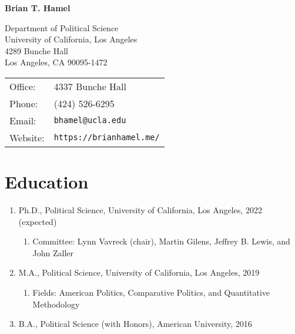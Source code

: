 \documentclass[11pt]{article}
\def\name{\textbf{Brian T. Hamel}}
\begin{document}
{\huge \name}


\vspace{0.25in}

\begin{minipage}{0.5\linewidth}
  Department of Political Science \\
  University of California, Los Angeles \\
  4289 Bunche Hall \\
  Los Angeles, CA 90095-1472 
\end{minipage}
\begin{minipage}{0.5\linewidth}
  \begin{tabular}{ll}
    Office: & 4337 Bunche Hall \\
    Phone: & (424) 526-6295 \\
    Email: & \texttt{bhamel@ucla.edu} \\
    Website: & \texttt{https://brianhamel.me/} \\
  \end{tabular}
\end{minipage}

\section*{Education}

\begin{enumerate}[topsep = 0pt, itemsep = 1ex, partopsep  = 1ex, parsep = 1ex]

	\item[] Ph.D., Political Science, University of California, Los Angeles, 2022 (expected)
	
	\begin{enumerate}[topsep = 0pt, itemsep = -1ex, partopsep = -1ex, parsep = 1ex]
		
		\item[] Committee: Lynn Vavreck (chair), Martin Gilens, Jeffrey B. Lewis, and John Zaller
	
	\end{enumerate}
		
	\item[] M.A., Political Science, University of California, Los Angeles, 2019
	
	\begin{enumerate}[topsep = 0pt, itemsep = -1ex, partopsep  = -1ex, parsep = 1ex]
	
		\item[] Fields: American Politics, Comparative Politics, and Quantitative Methodology
	
	\end{enumerate}
		
	\item[] B.A., Political Science (with Honors), American University, 2016

\end{enumerate}
\end{document}
